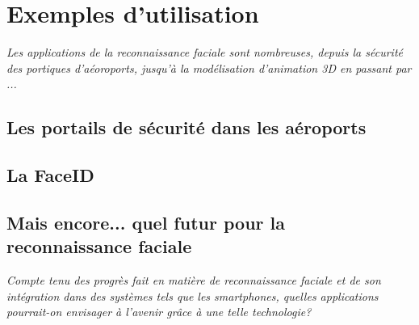 \section{Exemples d'utilisation}
\textit{Les applications de la reconnaissance faciale sont nombreuses, depuis la sécurité des portiques d'aéoroports, jusqu'à la modélisation d'animation 3D en passant par ... }
\subsection{Les portails de sécurité dans les aéroports}
\subsection{La FaceID}
\subsection{Mais encore... quel futur pour la reconnaissance faciale}
\textcolor{dkblue}{\textit{Compte tenu des progrès fait en matière de reconnaissance faciale et de son intégration dans des systèmes tels que les smartphones, quelles applications pourrait-on envisager à l'avenir grâce à une telle technologie?}}